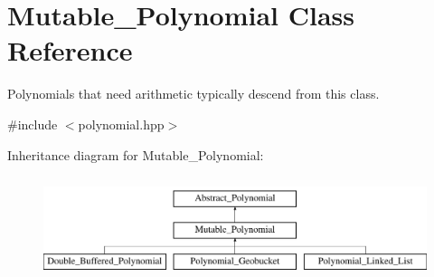 \hypertarget{class_mutable___polynomial}{}\section{Mutable\+\_\+\+Polynomial Class Reference}
\label{class_mutable___polynomial}


Polynomials that need arithmetic typically descend from this class.  




{\ttfamily \#include $<$polynomial.\+hpp$>$}

Inheritance diagram for Mutable\+\_\+\+Polynomial\+:\begin{figure}[H]
\begin{center}
\leavevmode
\includegraphics[height=3.000000cm]{class_mutable___polynomial}
\end{center}
\end{figure}
